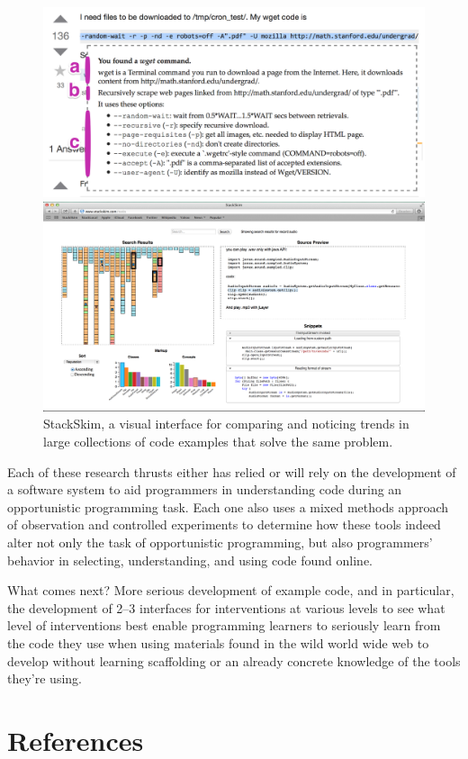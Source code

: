 \documentclass[12pt]{memoir}
\begin{document}
\begin{figure}%
  \centering
  \parbox{.45\textwidth}{%
    \includegraphics[width=\linewidth]{figures/tutorons_microexplanation}
    \caption{%
      A micro-explanation for a command line generated by a Tutoron with multiple levels of detail 
      (definition, high-level intent, arguments)
    }\label{fig:tutorons_microexplanation}
  }%
  \qquad
  \parbox{.45\textwidth}{%
    \includegraphics[width=\linewidth]{figures/stackskim_ui}
    \caption{%
      StackSkim, a visual interface for comparing and noticing trends in large collections of code examples that solve the same problem.
    }\label{fig:stackskim_ui}
  }
\end{figure}

Each of these research thrusts either has relied or will rely on the development of a software system to aid programmers in understanding code during an opportunistic programming task.
Each one also uses a mixed methods approach of observation and controlled experiments to determine how these tools indeed alter not only the task of opportunistic programming, but also programmers' behavior in selecting, understanding, and using code found online.

What comes next?  More serious development of example code, and in particular, the development of 2--3 interfaces for interventions at various levels to see what level of interventions best enable programming learners to seriously learn from the code they use when using materials found in the wild world wide web to develop without learning scaffolding or an already concrete knowledge of the tools they're using.

\section{References}
\printbibliography[heading=none]
\end{document}
